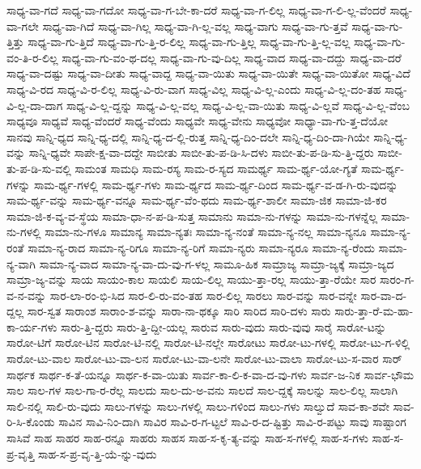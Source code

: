 {ಸಾಧ್ಯ-ವಾ-ಗದೆ
ಸಾಧ್ಯ-ವಾ-ಗದೋ
ಸಾಧ್ಯ-ವಾ-ಗ-ಬೇ-ಕಾ-ದರೆ
ಸಾಧ್ಯ-ವಾ-ಗ-ಲಿಲ್ಲ
ಸಾಧ್ಯ-ವಾ-ಗ-ಲಿ-ಲ್ಲ-ವೆಂದರೆ
ಸಾಧ್ಯ-ವಾ-ಗಲೇ
ಸಾಧ್ಯ-ವಾ-ಗಿದೆ
ಸಾಧ್ಯ-ವಾ-ಗಿಲ್ಲ
ಸಾಧ್ಯ-ವಾ-ಗಿ-ಲ್ಲ-ವಲ್ಲ
ಸಾಧ್ಯ-ವಾಗು
ಸಾಧ್ಯ-ವಾ-ಗು-ತ್ತವೆ
ಸಾಧ್ಯ-ವಾ-ಗು-ತ್ತಿತ್ತು
ಸಾಧ್ಯ-ವಾ-ಗು-ತ್ತಿದೆ
ಸಾಧ್ಯ-ವಾ-ಗು-ತ್ತಿ-ರ-ಲಿಲ್ಲ
ಸಾಧ್ಯ-ವಾ-ಗು-ತ್ತಿಲ್ಲ
ಸಾಧ್ಯ-ವಾ-ಗು-ತ್ತಿ-ಲ್ಲ-ವಲ್ಲ
ಸಾಧ್ಯ-ವಾ-ಗು-ವಂ-ತಿ-ರ-ಲಿಲ್ಲ
ಸಾಧ್ಯ-ವಾ-ಗು-ವಂ-ಥ-ದಲ್ಲ
ಸಾಧ್ಯ-ವಾ-ಗು-ವು-ದಿಲ್ಲ
ಸಾಧ್ಯ-ವಾದ
ಸಾಧ್ಯ-ವಾ-ದದ್ದು
ಸಾಧ್ಯ-ವಾ-ದರೆ
ಸಾಧ್ಯ-ವಾ-ದಷ್ಟು
ಸಾಧ್ಯ-ವಾ-ದೀತು
ಸಾಧ್ಯ-ವಾದ್ದ
ಸಾಧ್ಯ-ವಾ-ಯಿತು
ಸಾಧ್ಯ-ವಾ-ಯಿತೇ
ಸಾಧ್ಯ-ವಾ-ಯಿತೋ
ಸಾಧ್ಯ-ವಿದೆ
ಸಾಧ್ಯ-ವಿ-ರದ
ಸಾಧ್ಯ-ವಿ-ರ-ಲಿಲ್ಲ
ಸಾಧ್ಯ-ವಿ-ರು-ವಾಗ
ಸಾಧ್ಯ-ವಿಲ್ಲ
ಸಾಧ್ಯ-ವಿ-ಲ್ಲ-ಎಂದು
ಸಾಧ್ಯ-ವಿ-ಲ್ಲ-ದಂ-ತಹ
ಸಾಧ್ಯ-ವಿ-ಲ್ಲ-ದಾ-ದಾಗ
ಸಾಧ್ಯ-ವಿ-ಲ್ಲ-ದ್ದನ್ನು
ಸಾಧ್ಯ-ವಿ-ಲ್ಲ-ವಲ್ಲ
ಸಾಧ್ಯ-ವಿ-ಲ್ಲ-ವಾ-ಯಿತು
ಸಾಧ್ಯ-ವಿ-ಲ್ಲವೆ
ಸಾಧ್ಯ-ವಿ-ಲ್ಲ-ವೆಂಬ
ಸಾಧ್ಯವೂ
ಸಾಧ್ಯವೆ
ಸಾಧ್ಯ-ವೆಂದರೆ
ಸಾಧ್ಯ-ವೆಂದು
ಸಾಧ್ಯವೇ
ಸಾಧ್ಯ-ವೇನು
ಸಾಧ್ಯವೋ
ಸಾಧ್ಯಾ-ವಾ-ಗು-ತ್ತ-ದೆಯೋ
ಸಾನವು
ಸಾನ್ನಿ-ಧ್ಯದ
ಸಾನ್ನಿ-ಧ್ಯ-ದಲ್ಲಿ
ಸಾನ್ನಿ-ಧ್ಯ-ದ-ಲ್ಲಿ-ರುತ್ತ
ಸಾನ್ನಿ-ಧ್ಯ-ದಿಂ-ದಲೇ
ಸಾನ್ನಿ-ಧ್ಯ-ದಿಂ-ದಾ-ಗಿಯೇ
ಸಾನ್ನಿ-ಧ್ಯ-ವನ್ನು
ಸಾನ್ನಿ-ಧ್ಯವೇ
ಸಾಪೇ-ಕ್ಷ-ವಾ-ದದ್ದೇ
ಸಾಬೀತು
ಸಾಬೀ-ತು-ಪ-ಡಿ-ಸಿ-ದಳು
ಸಾಬೀ-ತು-ಪ-ಡಿ-ಸು-ತ್ತಿ-ದ್ದರು
ಸಾಬೀ-ತು-ಪ-ಡಿ-ಸು-ವಲ್ಲಿ
ಸಾಮಂತ
ಸಾಮಧಿ
ಸಾಮ-ರಸ್ಯ
ಸಾಮ-ರ-ಸ್ಯದ
ಸಾಮರ್ಥ್ಯ
ಸಾಮ-ರ್ಥ್ಯ-ಯೋ-ಗ್ಯತೆ
ಸಾಮ-ರ್ಥ್ಯ-ಗಳನ್ನು
ಸಾಮ-ರ್ಥ್ಯ-ಗಳಲ್ಲಿ
ಸಾಮ-ರ್ಥ್ಯ-ಗಳು
ಸಾಮ-ರ್ಥ್ಯದ
ಸಾಮ-ರ್ಥ್ಯ-ದಿಂದ
ಸಾಮ-ರ್ಥ್ಯ-ವ-ಡ-ಗಿ-ರು-ವುದನ್ನು
ಸಾಮ-ರ್ಥ್ಯ-ವನ್ನು
ಸಾಮ-ರ್ಥ್ಯ-ವನ್ನೂ
ಸಾಮ-ರ್ಥ್ಯ-ವೆಂ-ಥದು
ಸಾಮ-ರ್ಥ್ಯ-ಶಾಲೀ
ಸಾಮಾ-ಜಿಕ
ಸಾಮಾ-ಜಿ-ಕರ
ಸಾಮಾ-ಜಿ-ಕ-ವ್ಯ-ವ-ಸ್ಥೆಯ
ಸಾಮಾ-ಧಾ-ನ-ಪ-ಡಿ-ಸುತ್ತ
ಸಾಮಾನು
ಸಾಮಾ-ನು-ಗಳನ್ನು
ಸಾಮಾ-ನು-ಗಳನ್ನೆಲ್ಲ
ಸಾಮಾ-ನು-ಗಳಲ್ಲಿ
ಸಾಮಾ-ನು-ಗಳೂ
ಸಾಮಾನ್ಯ
ಸಾಮಾ-ನ್ಯತಃ
ಸಾಮಾ-ನ್ಯ-ನಂತೆ
ಸಾಮಾ-ನ್ಯ-ನಲ್ಲ
ಸಾಮಾ-ನ್ಯನೂ
ಸಾಮಾ-ನ್ಯ-ರಂತೆ
ಸಾಮಾ-ನ್ಯ-ರಾದ
ಸಾಮಾ-ನ್ಯ-ರಿಗೂ
ಸಾಮಾ-ನ್ಯ-ರಿಗೆ
ಸಾಮಾ-ನ್ಯರು
ಸಾಮಾ-ನ್ಯರೂ
ಸಾಮಾ-ನ್ಯ-ರೆಂದು
ಸಾಮಾ-ನ್ಯ-ವಾಗಿ
ಸಾಮಾ-ನ್ಯ-ವಾದ
ಸಾಮಾ-ನ್ಯ-ವಾ-ದು-ವು-ಗ-ಳಲ್ಲ
ಸಾಮೂ-ಹಿಕ
ಸಾಮ್ರಾಜ್ಯ
ಸಾಮ್ರಾ-ಜ್ಯಕ್ಕೆ
ಸಾಮ್ರಾ-ಜ್ಯದ
ಸಾಮ್ರಾ-ಜ್ಯ-ವನ್ನು
ಸಾಯ
ಸಾಯಂ-ಕಾಲ
ಸಾಯಲಿ
ಸಾಯ-ಲಿಲ್ಲ
ಸಾಯು-ತ್ತಾ-ರಲ್ಲ
ಸಾಯು-ತ್ತಾ-ರೆಯೇ
ಸಾರ
ಸಾರಂ-ಗ-ವ-ನ-ವನ್ನು
ಸಾರ-ಲಾ-ರಂ-ಭಿ-ಸಿದ
ಸಾರ-ಲಿ-ರು-ವಂ-ತಹ
ಸಾರ-ಲಿಲ್ಲ
ಸಾರಲು
ಸಾರ-ವನ್ನು
ಸಾರ-ವನ್ನೇ
ಸಾರ-ವಾ-ದ-ದ್ದಲ್ಲ
ಸಾರ-ಸ್ವತ
ಸಾರಾಂಶ
ಸಾರಾಂ-ಶ-ವನ್ನು
ಸಾರಾ-ನಾ-ಥಕ್ಕೂ
ಸಾರಿ
ಸಾರಿದ
ಸಾರಿ-ದಳು
ಸಾರು
ಸಾರು-ತ್ತಾ-ರೆ-ಮ-ಹಾ-ಕಾ-ರ್ಯ-ಗಳು
ಸಾರು-ತ್ತಿ-ದ್ದರು
ಸಾರು-ತ್ತಿ-ದ್ದೀ-ಯಲ್ಲ
ಸಾರುವ
ಸಾರು-ವುದು
ಸಾರು-ವುವು
ಸಾರೈ
ಸಾರೋ-ಟನ್ನು
ಸಾರೋ-ಟಿಗೆ
ಸಾರೋ-ಟಿನ
ಸಾರೋ-ಟಿ-ನಲ್ಲಿ
ಸಾರೋ-ಟಿ-ನಲ್ಲೇ
ಸಾರೋಟು
ಸಾರೋ-ಟು-ಗಳಲ್ಲಿ
ಸಾರೋ-ಟು-ಗ-ಳಿಲ್ಲಿ
ಸಾರೋ-ಟು-ವಾಲ
ಸಾರೋ-ಟು-ವಾ-ಲನ
ಸಾರೋ-ಟು-ವಾ-ಲನೇ
ಸಾರೋ-ಟು-ವಾಲಾ
ಸಾರೋ-ಟು-ಸ-ವಾರ
ಸಾರ್
ಸಾರ್ಥಕ
ಸಾರ್ಥ-ಕ-ತೆ-ಯನ್ನೂ
ಸಾರ್ಥ-ಕ-ವಾ-ಯಿತು
ಸಾರ್ವ-ಕಾ-ಲಿ-ಕ-ವಾ-ದ-ವು-ಗಳು
ಸಾರ್ವ-ಜ-ನಿಕ
ಸಾರ್ವ-ಭೌಮ
ಸಾಲ
ಸಾಲ-ಗಳ
ಸಾಲ-ಗಾ-ರ-ರೆಲ್ಲ
ಸಾಲದು
ಸಾಲ-ದು-ಅ-ವನು
ಸಾಲದೆ
ಸಾಲ-ದ್ದಕ್ಕೆ
ಸಾಲನ್ನು
ಸಾಲ-ಲಿಲ್ಲ
ಸಾಲಾಗಿ
ಸಾಲಿ-ನಲ್ಲಿ
ಸಾಲಿ-ರು-ವುದು
ಸಾಲು-ಗಳನ್ನು
ಸಾಲು-ಗಳಲ್ಲಿ
ಸಾಲು-ಗಳಿಂದ
ಸಾಲು-ಗಳು
ಸಾಲ್ವುದೆ
ಸಾವ-ಕಾ-ಶವೇ
ಸಾವ-ರಿ-ಸಿ-ಕೊಂಡು
ಸಾವಿನ
ಸಾವಿ-ನಿಂ-ದಾಗಿ
ಸಾವಿರ
ಸಾವಿ-ರ-ಗ-ಟ್ಟಲೆ
ಸಾವಿ-ರ-ದ-ಷ್ಟಿತ್ತು
ಸಾವಿ-ರ-ಪಟ್ಟು
ಸಾವು
ಸಾಷ್ಟಾಂಗ
ಸಾಸಿವೆ
ಸಾಹ
ಸಾಹರ
ಸಾಹ-ರನ್ನೂ
ಸಾಹರು
ಸಾಹಸ
ಸಾಹ-ಸ-ಕೃ-ತ್ಯ-ವನ್ನು
ಸಾಹ-ಸ-ಗಳಲ್ಲಿ
ಸಾಹ-ಸ-ಗಳು
ಸಾಹ-ಸ-ಪ್ರ-ವೃತ್ತಿ
ಸಾಹ-ಸ-ಪ್ರ-ವೃ-ತ್ತಿ-ಯೆ-ನ್ನು-ವುದು
}
